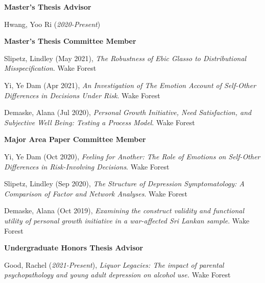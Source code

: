 {\large\textbf{Master's Thesis Advisor}}
\begin{etaremune}%
\item Hwang, Yoo Ri (\textit{2020-Present})
\end{etaremune}%

{\large\textbf{Master's Thesis Committee Member}}
\begin{etaremune}%
\item  Slipetz, Lindley (May 2021), \textit{The Robustness of Ebic Glasso to Distributional Misspecification}. Wake Forest
\item Yi, Ye Dam (Apr 2021), \textit{An Investigation of The Emotion Account of Self-Other Differences in Decisions Under Risk}. Wake Forest
\item Demaske, Alana (Jul 2020), \textit{Personal Growth Initiative, Need Satisfaction, and Subjective Well Being: Testing a Process Model}. Wake Forest%
\end{etaremune}%
%
{\large\textbf{Major Area Paper Committee Member}}
\begin{etaremune}%
\item Yi, Ye Dam (Oct 2020), \textit{Feeling for Another: The Role of Emotions on Self-Other Differences in Risk-Involving Decisions}. Wake Forest%
\item Slipetz, Lindley (Sep 2020), \textit{The Structure of Depression Symptomatology: A Comparison of Factor and Network Analyses}. Wake Forest%
\item Demaske, Alana (Oct 2019), \textit{Examining the construct validity and functional utility of personal growth initiative in a war-affected Sri Lankan sample}. Wake Forest%
\end{etaremune}%
%
\pagebreak
{\large\textbf{Undergraduate Honors Thesis Advisor}}
\begin{etaremune}%
\item Good, Rachel (\textit{2021-Present}), \textit{Liquor Legacies: The impact of parental psychopathology and young adult depression on alcohol use.} Wake Forest%
\end{etaremune}%

